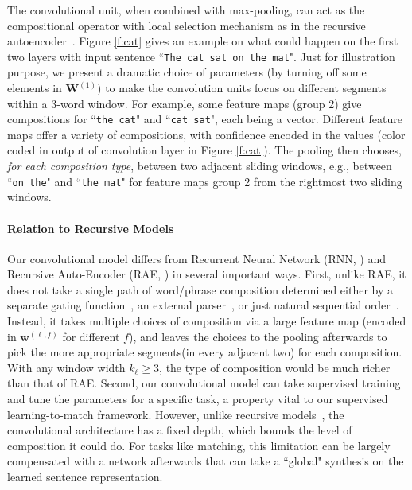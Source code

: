 \documentclass{article} \usepackage{nips14submit_e,times}
\newcommand{\W}{\ensuremath{\mathbf{W}}}
\newcommand{\w}{\ensuremath{\mathbf{w}}}
\newcommand{\0}{\ensuremath{\mathbf{0}}}
\newcommand{\1}{\ensuremath{\mathbf{1}}}
\begin{document}
The convolutional unit, when combined with max-pooling, can act as the compositional operator with local selection mechanism as in the recursive autoencoder~\cite{RAE}. Figure \ref{f:cat} gives an example on what could happen on the first two layers with input sentence ``\texttt{\small The cat sat on the mat}". Just for illustration purpose, we present a dramatic choice of parameters (by turning off some elements in $\W^{(1)}$) to make the convolution units focus on different segments within a 3-word window. For example, some feature maps (group 2) give compositions for ``\texttt{\small the cat}" and ``\texttt{\small cat sat}", each being a vector. Different feature maps offer a variety of compositions, with confidence encoded in the values (color coded in output of convolution layer in Figure \ref{f:cat}). The pooling then chooses, \emph{for each composition type}, between two adjacent sliding windows, e.g., between ``\texttt{\small on the}" and ``\texttt{\small the mat}" for feature maps group 2 from the rightmost two sliding windows.

\paragraph{Relation to Recursive Models} Our convolutional model differs from Recurrent Neural Network (RNN, \cite{RNN}) and Recursive Auto-Encoder (RAE, \cite{RAE}) in several important ways. First, unlike RAE, it does not take a single path of word/phrase composition determined either by a separate gating function~\cite{RAE}, an external parser~\cite{socher2011}, or just natural sequential order~\cite{socherRNN}. Instead, it takes multiple choices of composition via a large feature map (encoded in $\w^{(\ell,f)}$ for different $f$), and leaves the choices to the pooling afterwards to pick the more appropriate segments(in every adjacent two) for each composition. With any window width $k_{\ell}\geq 3$, the type of composition would be much richer than that of RAE. Second, our convolutional model can take supervised training and tune the parameters for a specific task, a property vital to our supervised learning-to-match framework. However, unlike recursive models~\cite{socherRNN, RAE}, the convolutional architecture has a fixed depth, which bounds the level of composition it could do. For tasks like matching, this limitation can be largely compensated with a network afterwards that can take a ``global" synthesis on the learned sentence representation.
\end{document}
